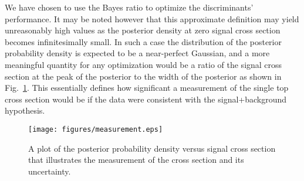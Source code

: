 We have chosen to use the Bayes ratio to optimize the discriminants'
performance. It may be noted however that this approximate definition
may yield unreasonably high values as the posterior density at zero
signal cross section becomes infinitesimally small. In such a case the
distribution of the posterior probability density is expected to be a
near-perfect Gaussian, and a more meaningful quantity for any
optimization would be a ratio of the signal cross section at the peak
of the posterior to the width of the posterior as shown in
Fig.~\ref{fig:measurement}. This essentially defines how significant a
measurement of the single top cross section would be if the data were
consistent with the signal+background hypothesis.

\begin{figure}[!h!tbp]
\texttt{[image: figures/measurement.eps]}
\vspace{-0.1in}
\begin{minipage}{4in}
\caption[measurement]{A plot of the posterior probability density
versus signal cross section that illustrates the measurement of the
cross section and its uncertainty.}
\label{fig:measurement}
\end{minipage}
\end{figure}


